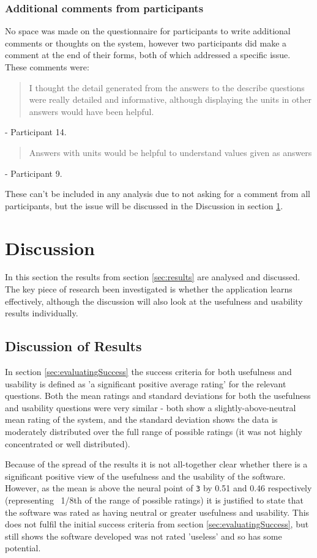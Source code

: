 \documentclass[authoryearcitations]{UoYCSproject}
\begin{document}
\subsection{Additional comments from participants}
\label{subsec:resultsComments}

No space was made on the questionnaire for participants to write additional comments or thoughts on the system, however two participants did make a comment at the end of their forms, both of which addressed a specific issue. These comments were:

\blockquote{I thought the detail generated from the answers to the describe questions were really detailed and informative, although displaying the units in other answers would have been helpful.} - Participant 14.

\blockquote{Answers with units would be helpful to understand values given as answers} - Participant 9.

These can't be included in any analysis due to not asking for a comment from all participants, but the issue will be discussed in the Discussion in section \ref{sec:discussion}.

\newpage
\chapter{Discussion}
\label{sec:discussion}

In this section the results from section \ref{sec:results} are analysed and discussed. The key piece of research been investigated is whether the application learns effectively, although the discussion will also look at the usefulness and usability results individually.

\section{Discussion of Results}
\label{sec:disResults}
In section \ref{sec:evaluatingSuccess} the success criteria for both usefulness and usability is defined as 'a significant positive average rating' for the relevant questions. Both the mean ratings and standard deviations for both the usefulness and usability questions were very similar - both show a slightly-above-neutral mean rating of the system, and the standard deviation shows the data is moderately distributed over the full range of possible ratings (it was not highly concentrated or well distributed).

Because of the spread of the results it is not all-together clear whether there is a significant positive view of the usefulness and the usability of the software. However, as the mean is above the neural point of \texttt{3} by 0.51 and 0.46 respectively (representing ~1/8th of the range of possible ratings) it is justified to state that the software was rated as having neutral or greater usefulness and usability. This does not fulfil the initial success criteria from section \ref{sec:evaluatingSuccess}, but still shows the software developed was not rated 'useless' and so has some potential.
\end{document}
